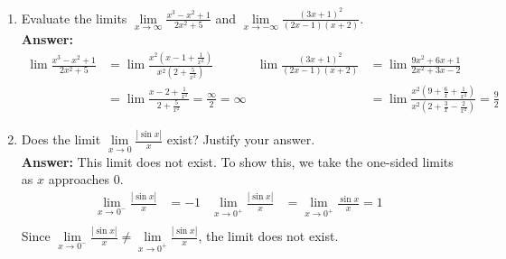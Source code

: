\documentclass{article}
\begin{document}
\begin{enumerate}
        \item Evaluate the limits $\lim\limits_{x \to \infty} \frac{x^3-x^2+1}{2x^2+5}$ and $\lim\limits_{x \to -\infty} \frac{(3x+1)^2}{(2x-1)(x+2)}$.\\
        \textbf{Answer: }
        \begin{align*}
            \lim \frac{x^3-x^2+1}{2x^2+5} &= \lim \frac{x^2(x-1+\frac{1}{x^2})}{x^2(2+\frac{5}{x^2})}    &  \lim \frac{(3x+1)^2}{(2x-1)(x+2)} &= \lim \frac{9x^2+6x+1}{2x^2+3x-2}  \\
            &= \lim \frac{x-2+\frac{1}{x^2}}{2+\frac{5}{x^2}} =  \frac{\infty}{2} = \infty   &   &= \lim \frac{x^2(9+\frac{6}{x}+\frac{1}{x^2})}{x^2(2+\frac{3}{x}-\frac{2}{x^2})} = \frac{9}{2} 
        \end{align*}
        
        \item Does the limit $\lim\limits_{x \to 0} \frac{|\sin x|}{x}$ exist? Justify your answer.\\
        \textbf{Answer: }This limit does not exist. To show this, we take the one-sided limits as $x$ approaches $0$.
        \begin{align*}
            \lim_{x \to 0^-} \frac{|\sin{x}|}{x} &= -1    &     \lim_{x \to 0^+}\frac{|\sin{x}|}{x} &= \lim_{x \to 0^+} \frac{\sin{x}}{x} = 1 \\
        \end{align*}
        Since $\lim\limits_{x \to 0^-}\frac{|\sin{x}|}{x} \neq \lim\limits_{x \to 0^+}\frac{|\sin{x}|}{x}$, the limit does not exist.
    \end{enumerate}
\end{document}
